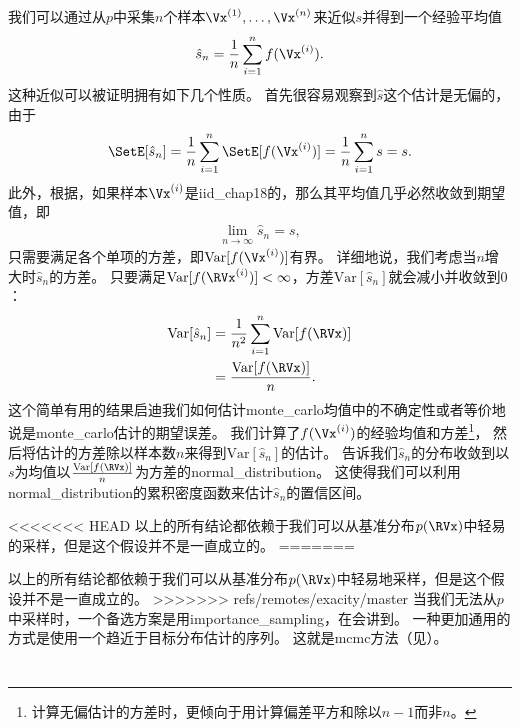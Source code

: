 我们可以通过从$p$中采集$n$个样本$\Vx^{(1)},\ldots,\Vx^{(n)}$来近似$s$并得到一个经验平均值
\begin{align}	
\hat{s}_n = \frac{1}{n}\sum_{i=1}^{n}f(\Vx^{(i)}).
\end{align}
这种近似可以被证明拥有如下几个性质。
首先很容易观察到$\hat{s}$这个估计是无偏的，由于
\begin{align}
\SetE[\hat{s}_n] = \frac{1}{n}\sum_{i=1}^{n}\SetE[f(\Vx^{(i)})] = \frac{1}{n}\sum_{i=1}^{n}s = s.
\end{align}
此外，根据，如果样本$\Vx^{(i)}$是\gls{iid_chap18}的，那么其平均值几乎必然收敛到期望值，即
\begin{align}
\lim_{n\xrightarrow{}\infty} \hat{s}_n = s,
\end{align}
只需要满足各个单项的方差，即$\text{Var}[f(\Vx^{(i)})]$有界。
详细地说，我们考虑当$n$增大时$\hat{s}_n$的方差。
只要满足$\text{Var}[f(\RVx^{(i)})]<\infty$，方差$\text{Var}[\hat{s}_n]$就会减小并收敛到$0$：
\begin{align}
\text{Var}[\hat{s}_n] & = \frac{1}{n^2}\sum_{i=1}^{n}\text{Var}[f(\RVx)]\\
&  = \frac{\text{Var}[f(\RVx)]}{n}.
\end{align}
这个简单有用的结果启迪我们如何估计\gls{monte_carlo}均值中的不确定性或者等价地说是\gls{monte_carlo}估计的期望误差。
我们计算了$f(\Vx^{(i)})$的经验均值和方差\footnote{计算无偏估计的方差时，更倾向于用计算偏差平方和除以$n-1$而非$n$。}，
然后将估计的方差除以样本数$n$来得到$\text{Var}[\hat{s}_n]$的估计。
告诉我们$\hat{s}_n$的分布收敛到以$s$为均值以$\frac{\text{Var}[f(\RVx)]}{n}$为方差的\gls{normal_distribution}。
这使得我们可以利用\gls{normal_distribution}的累积密度函数来估计$\hat{s}_n$的置信区间。

<<<<<<< HEAD
以上的所有结论都依赖于我们可以从基准分布$p(\RVx)$中轻易的采样，但是这个假设并不是一直成立的。
=======

以上的所有结论都依赖于我们可以从基准分布$p(\RVx)$中轻易地采样，但是这个假设并不是一直成立的。
>>>>>>> refs/remotes/exacity/master
当我们无法从$p$中采样时，一个备选方案是用\gls{importance_sampling}，在会讲到。
一种更加通用的方式是使用一个趋近于目标分布估计的序列。
这就是\gls{mcmc}方法（见）。

\section{}
\label{sec:importance_sampling_chap17}

